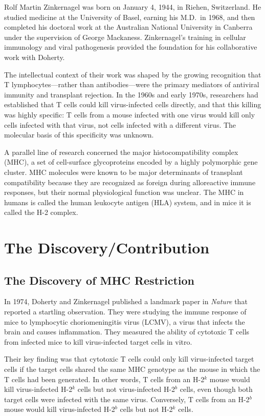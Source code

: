 Rolf Martin Zinkernagel was born on January 4, 1944, in Riehen, Switzerland. He studied medicine at the University of Basel, earning his M.D.\ in 1968, and then completed his doctoral work at the Australian National University in Canberra under the supervision of George Mackaness. Zinkernagel's training in cellular immunology and viral pathogenesis provided the foundation for his collaborative work with Doherty.

The intellectual context of their work was shaped by the growing recognition that T lymphocytes---rather than antibodies---were the primary mediators of antiviral immunity and transplant rejection. In the 1960s and early 1970s, researchers had established that T cells could kill virus-infected cells directly, and that this killing was highly specific: T cells from a mouse infected with one virus would kill only cells infected with that virus, not cells infected with a different virus. The molecular basis of this specificity was unknown.

A parallel line of research concerned the major histocompatibility complex (MHC), a set of cell-surface glycoproteins encoded by a highly polymorphic gene cluster. MHC molecules were known to be major determinants of transplant compatibility because they are recognized as foreign during alloreactive immune responses, but their normal physiological function was unclear. The MHC in humans is called the human leukocyte antigen (HLA) system, and in mice it is called the H-2 complex.

\section{The Discovery/Contribution}

\subsection{The Discovery of MHC Restriction}

In 1974, Doherty and Zinkernagel published a landmark paper in \textit{Nature} that reported a startling observation. They were studying the immune response of mice to lymphocytic choriomeningitis virus (LCMV), a virus that infects the brain and causes inflammation. They measured the ability of cytotoxic T cells from infected mice to kill virus-infected target cells in vitro.

Their key finding was that cytotoxic T cells could only kill virus-infected target cells if the target cells shared the same MHC genotype as the mouse in which the T cells had been generated. In other words, T cells from an H-2$^k$ mouse would kill virus-infected H-2$^k$ cells but not virus-infected H-2$^b$ cells, even though both target cells were infected with the same virus. Conversely, T cells from an H-2$^b$ mouse would kill virus-infected H-2$^b$ cells but not H-2$^k$ cells.

